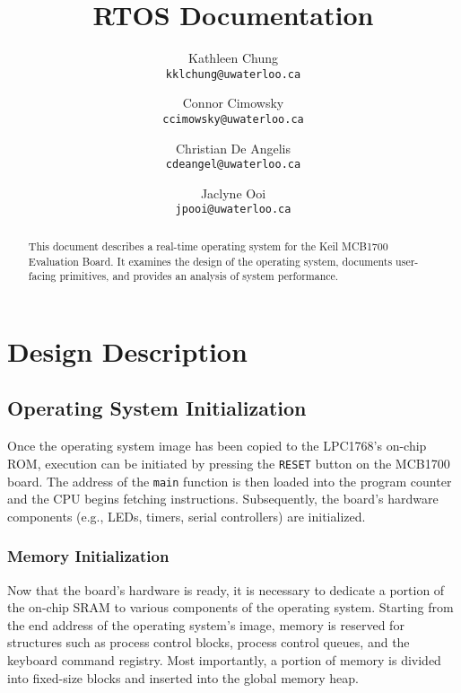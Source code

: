 \documentclass[12pt]{report}
\begin{document}
\title{RTOS Documentation}

\author{
    Kathleen Chung\\
    \texttt{kklchung@uwaterloo.ca}
    \and
    Connor Cimowsky\\
    \texttt{ccimowsky@uwaterloo.ca}
    \and
    Christian De Angelis\\
    \texttt{cdeangel@uwaterloo.ca}
    \and
    Jaclyne Ooi\\
    \texttt{jpooi@uwaterloo.ca}
}

\maketitle

\begin{abstract}

This document describes a real-time operating system for the Keil MCB1700 Evaluation Board. It examines the design of the operating system, documents user-facing primitives, and provides an analysis of system performance.

\end{abstract}

\tableofcontents

\listofalgorithms

\chapter{Design Description}

\section{Operating System Initialization}

Once the operating system image has been copied to the LPC1768's on-chip ROM, execution can be initiated by pressing the \texttt{RESET} button on the MCB1700 board. The address of the \texttt{main} function is then loaded into the program counter and the CPU begins fetching instructions. Subsequently, the board's hardware components (e.g., LEDs, timers, serial controllers) are initialized.

\subsection{Memory Initialization}


Now that the board's hardware is ready, it is necessary to dedicate a portion of the on-chip SRAM to various components of the operating system. Starting from the end address of the operating system's image, memory is reserved for structures such as process control blocks, process control queues, and the keyboard command registry. Most importantly, a portion of memory is divided into fixed-size blocks and inserted into the global memory heap.
\end{document}
